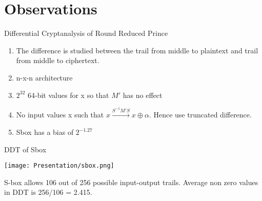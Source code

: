 \section{Observations}

\begin{frame}{Differential Cryptanalysis of Round Reduced Prince}
\begin{enumerate}
    \item The difference is studied between the trail from middle to plaintext and trail from middle to ciphertext. 
    \item n-x-n architecture
    \item $2^{32}$ 64-bit values for x so that $M'$ has no effect
    \item No input values x such that $x\xrightarrow{S^{-1}M'S}x\oplus\alpha$. Hence use truncated difference.
    \item Sbox has a bias of $2^{-1.27}$
\end{enumerate}
\end{frame}

\begin{frame}{DDT of Sbox}
\begin{center}
\texttt{[image: Presentation/sbox.png]}
\end{center}
S-box allows 106 out of 256 possible input-output trails. Average non zero values in DDT is 256/106 = 2.415.
\end{frame}

